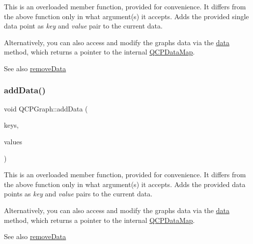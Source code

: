 This is an overloaded member function, provided for convenience. It differs from the above function only in what argument(s) it accepts. Adds the provided single data point as {\itshape key} and {\itshape value} pair to the current data.

Alternatively, you can also access and modify the graph\textquotesingle{}s data via the \hyperlink{class_q_c_p_graph_acde1c0d1f6a817930489548396e6b3e6}{data} method, which returns a pointer to the internal \hyperlink{qcustomplot_8h_a84a9c4a4c2216ccfdcb5f3067cda76e3}{Q\+C\+P\+Data\+Map}.

\begin{DoxySeeAlso}{See also}
\hyperlink{class_q_c_p_graph_a4a0fde50b7db9db0a85b5c5b6b10098f}{remove\+Data} 
\end{DoxySeeAlso}
\hypertarget{class_q_c_p_graph_ab6da6377541fe80d892a9893a92db9c6}{}\label{class_q_c_p_graph_ab6da6377541fe80d892a9893a92db9c6} 
\subsubsection{\texorpdfstring{add\+Data()}{addData()}\hspace{0.1cm}{\footnotesize\ttfamily [4/4]}}
{\footnotesize\ttfamily void Q\+C\+P\+Graph\+::add\+Data (\begin{DoxyParamCaption}\item[{const Q\+Vector$<$ double $>$ \&}]{keys,  }\item[{const Q\+Vector$<$ double $>$ \&}]{values }\end{DoxyParamCaption})}

This is an overloaded member function, provided for convenience. It differs from the above function only in what argument(s) it accepts. Adds the provided data points as {\itshape key} and {\itshape value} pairs to the current data.

Alternatively, you can also access and modify the graph\textquotesingle{}s data via the \hyperlink{class_q_c_p_graph_acde1c0d1f6a817930489548396e6b3e6}{data} method, which returns a pointer to the internal \hyperlink{qcustomplot_8h_a84a9c4a4c2216ccfdcb5f3067cda76e3}{Q\+C\+P\+Data\+Map}.

\begin{DoxySeeAlso}{See also}
\hyperlink{class_q_c_p_graph_a4a0fde50b7db9db0a85b5c5b6b10098f}{remove\+Data} 
\end{DoxySeeAlso}
\hypertarget{class_q_c_p_graph_ad4e94a4e44e5e76fbec81a72a977157d}{}\label{class_q_c_p_graph_ad4e94a4e44e5e76fbec81a72a977157d} 
